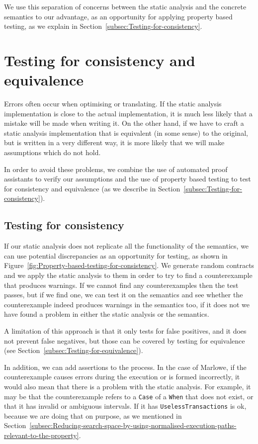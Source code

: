 \documentclass[english,runningheads]{llncs}
\begin{document}
We use this separation of concerns between the static analysis and
the concrete semantics to our advantage, as an opportunity for applying
property based testing, as we explain in Section~\ref{subsec:Testing-for-consistency}.

\section{Testing for consistency and equivalence\label{sec:Testing}}

Errors often occur when optimising or translating. If the static analysis
implementation is close to the actual implementation, it is much less
likely that a mistake will be made when writing it. On the other hand,
if we have to craft a static analysis implementation that is equivalent
(in some sense) to the original, but is written in a very different
way, it is more likely that we will make assumptions which do not
hold.

In order to avoid these problems, we combine the use of automated proof
assistants to verify our assumptions and the use of property based testing to
test for consistency and equivalence (as we describe in
Section~\ref{subsec:Testing-for-consistency}).

\subsection{Testing for consistency\label{subsec:Testing-for-consistency} }

If our static analysis does not replicate all the functionality of
the semantics, we can use potential discrepancies as an opportunity
for testing, as shown in Figure~\ref{fig:Property-based-testing-for-consistency}.
We generate random contracts and we apply the static analysis to them
in order to try to find a counterexample that produces warnings. If
we cannot find any counterexamples then the test passes, but if we
find one, we can test it on the semantics and see whether the counterexample
indeed produces warnings in the semantics too, if it does not we have
found a problem in either the static analysis or the semantics.

A limitation of this approach is that it only tests for false positives,
and it does not prevent false negatives, but those can be covered by testing
for equivalence (see Section~\ref{subsec:Testing-for-equivalence}).

In addition, we can add assertions to the process. In the case of
Marlowe, if the counterexample causes errors during the execution or is
formed incorrectly, it would also mean that there is a problem with
the static analysis. For example, it may be that the counterexample
refers to a \texttt{Case} of a \texttt{When} that does not exist,
or that it has invalid or ambiguous intervals. If it has \texttt{UselessTransactions}
is ok, because we are doing that on purpose, as we mentioned in Section~\ref{subsec:Reducing-search-space-by-using-normalised-execution-paths-relevant-to-the-property}.
\end{document}

